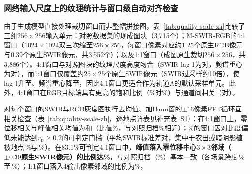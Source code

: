 \documentclass[UTF8,a4paper,10pt]{ctexart}
\begin{document}
\subsubsection{网络输入尺度上的纹理统计与窗口级自动对齐检查}\label{sec:quality-scale}\label{sec:quality-align}
由于生成模型直接处理裁切窗口而非整幅拼接图，表~\ref{tab:quality-scale-zh}比较了三组$256\times256$输入单元：对照数据集\cite{chen2026thesis}的现成图块（3{,}715个）；M-SWIR-RGB的4:1窗口（$1024\times1024$双三次缩至$256\times256$，每窗口像素对应约1.25个原生RGB像元与0.39个原生SWIR像元，共3{,}552个）；以及1:1窗口（成图原生裁切$256\times256$，共3{,}886个）。4:1窗口与对照图块的纹理尺度高度吻合（SWIR lag-1为\ScaleMsLagOne{}对\ScaleChenLagOne，频谱重心为\ScaleMsPsd{}对\ScaleChenPsd），而1:1窗口仅覆盖约$25\times25$个原生SWIR像元（SWIR过采样约10倍），使lag-1升至\ScaleNativeLagOne、频谱重心降至\ScaleNativePsd，因此4:1窗口更适合作为轨道A的默认采样单元。此外，4:1窗口在RGB目标端具有更高的饱和比例（\ScaleMsRgbSat\%对\ScaleChenRgbSat\%）与通道间相关（\ScaleMsRgbChanCorr{}对\ScaleChenRgbChanCorr）。

对每个窗口的SWIR与RGB灰度图执行去均值、加Hann窗的$\pm16$像素FFT循环互相关检查\cite{reddy1996,guizar2008}（表~\ref{tab:quality-scale-zh}，逐地点详表见补充表~S1）：在4:1窗口上，零位移相关与峰值相关均值为\ScaleMsAbCorr{}和\ScaleMsAbPeak（比值\ScaleMsAbRatio\%，与对照归档\ScaleChenAbRatio\%相近）；\ScaleMsPeakWeakPct\%的窗口因对比度偏低未能达到$r_{\mathrm{p}}\geq0.2$的可判定门槛（平均SWIR标准差\ScaleMsWeakStd{}对\ScaleMsStrongStd，集中于农田或暗阴影植被地点\SceneWeakMaxName{}\,\SceneWeakMax\%与\SceneWeakSecondName{}\,\SceneWeakSecond\%）。在83.1\%可判定4:1窗口中，\textbf{峰值落入零位移中心$3\times3$邻域（$\pm0.39$原生SWIR像元）的比例达\ScaleMsPeakWithinOnePxStrong\%}，与对照归档（\ScaleChenPeakWithinOnePxStrong\%）基本一致（各场景跨度\SceneAlignMinName{}\,\SceneAlignMin\%至\SceneAlignMaxName{}\,\SceneAlignMax\%）；1:1窗口落入4输出像素邻域的比例为\ScaleNativePeakWithinFourPx\%。

\begin{table}[htbp]\centering\footnotesize\setlength{\tabcolsep}{4pt}
\caption{三组输入单元的纹理尺度与模态间灰度相关统计。}\label{tab:quality-scale-zh}

\end{table}
\end{document}
